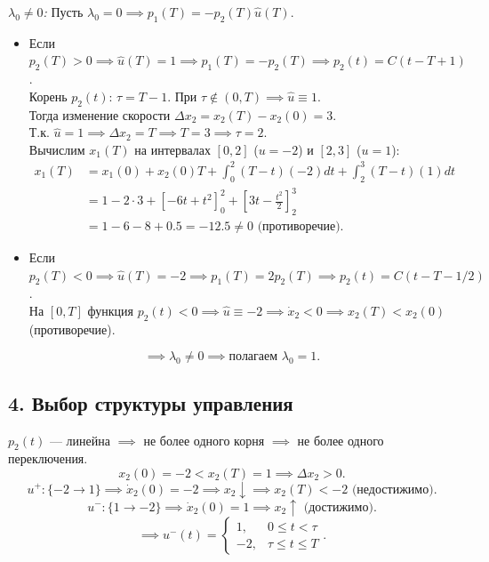 \documentclass[12pt]{article}
\begin{document}
\textit{\(\lambda_0 \neq 0\):} 
Пусть \(\lambda_0 = 0 \implies p_1(T) = -p_2(T)\hat{u}(T)\).
\begin{itemize}
    \item Если \(p_2(T) > 0 \implies \hat{u}(T) = 1 \implies p_1(T) = -p_2(T) \implies p_2(t) = C(t - T + 1)\). \\
    
    Корень \(p_2(t)\): \(\tau = T - 1\). При \(\tau \notin (0,T) \implies \hat{u} \equiv 1\). \\
    
    Тогда изменение скорости \(\Delta x_2 = x_2(T) - x_2(0) = 3\). \\
    
    Т.к. \(\hat{u}=1 \implies \Delta x_2 = T \implies T = 3 \implies \tau = 2\). \\
    
    Вычислим \(x_1(T)\) на интервалах \([0,2]\) (\(u=-2\)) и \([2,3]\) (\(u=1\)):
    \begin{align*}
    x_1(T) &= x_1(0) + x_2(0)T + \int_0^2 (T-t)(-2)dt + \int_2^3 (T-t)(1)dt \\
    &= 1 - 2\cdot 3 + \left[-6t + t^2\right]_0^2 + \left[3t - \frac{t^2}{2}\right]_2^3 \\
    &= 1 - 6 - 8 + 0.5 = -12.5 \neq 0 \text{ (противоречие)}.
    \end{align*}
    \item Если \(p_2(T) < 0 \implies \hat{u}(T) = -2 \implies p_1(T) = 2p_2(T) \implies p_2(t) = C(t - T - 1/2)\). \\
    
    На \([0,T]\) функция \(p_2(t) < 0 \implies \hat{u} \equiv -2 \implies \dot{x}_2 < 0 \implies x_2(T) < x_2(0)\) (противоречие).
\end{itemize}
\[
\implies \lambda_0 \neq 0 \implies \text{полагаем } \lambda_0 = 1.
\]

\subsection*{4. Выбор структуры управления}
\(p_2(t)\) — линейна \(\implies\) не более одного корня \(\implies\) не более одного переключения.
\[
x_2(0) = -2 < x_2(T) = 1 \implies \Delta x_2 > 0.
\]
\[
u^+: \{-2 \to 1\} \implies \dot{x}_2(0) = -2 \implies x_2 \downarrow \implies x_2(T) < -2 \text{ (недостижимо)}.
\]
\[
u^-: \{1 \to -2\} \implies \dot{x}_2(0) = 1 \implies x_2 \uparrow \text{ (достижимо)}.
\]
\[
\implies u^-(t) = \begin{cases} 1, & 0 \le t < \tau \\ -2, & \tau \le t \le T \end{cases}.
\]
\end{document}
